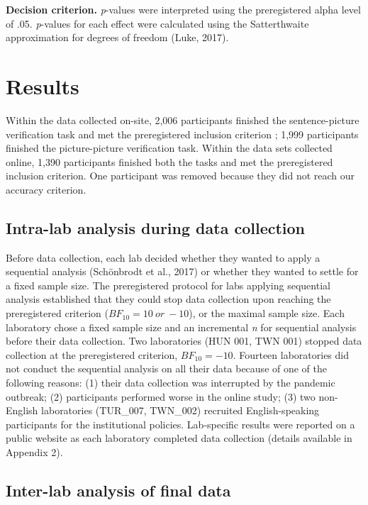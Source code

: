 \documentclass[
  man,floatsintext]{apa6}
\begin{document}
\textbf{Decision criterion.} \emph{p}-values were interpreted using the preregistered alpha level of .05. \emph{p}-values for each effect were calculated using the Satterthwaite approximation for degrees of freedom (Luke, 2017).

\hypertarget{results}{%
\section{Results}\label{results}}

Within the data collected on-site, 2,006 participants finished the sentence-picture verification task and met the preregistered inclusion criterion ; 1,999 participants finished the picture-picture verification task. Within the data sets collected online, 1,390 participants finished both the tasks and met the preregistered inclusion criterion. One participant was removed because they did not reach our accuracy criterion.

\hypertarget{intra-lab-analysis-during-data-collection}{%
\subsection{Intra-lab analysis during data collection}\label{intra-lab-analysis-during-data-collection}}

Before data collection, each lab decided whether they wanted to apply a sequential analysis (Schönbrodt et al., 2017) or whether they wanted to settle for a fixed sample size. The preregistered protocol for labs applying sequential analysis established that they could stop data collection upon reaching the preregistered criterion (\(BF_{10} = 10\ or\ -10\)), or the maximal sample size. Each laboratory chose a fixed sample size and an incremental \emph{n} for sequential analysis before their data collection. Two laboratories (HUN 001, TWN 001) stopped data collection at the preregistered criterion, \(BF_{10} = -10\). Fourteen laboratories did not conduct the sequential analysis on all their data because of one of the following reasons: (1) their data collection was interrupted by the pandemic outbreak; (2) participants performed worse in the online study; (3) two non-English laboratories (TUR\_007, TWN\_002) recruited English-speaking participants for the institutional policies. Lab-specific results were reported on a public website as each laboratory completed data collection (details available in Appendix 2).

\hypertarget{inter-lab-analysis-of-final-data}{%
\subsection{Inter-lab analysis of final data}\label{inter-lab-analysis-of-final-data}}
\end{document}
